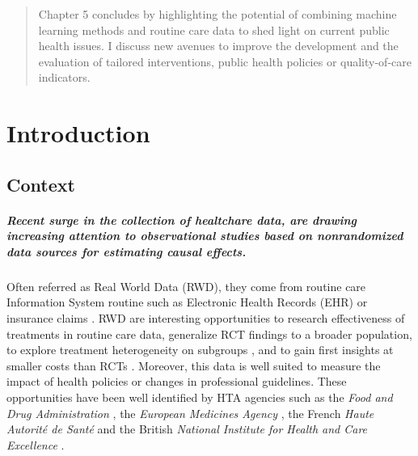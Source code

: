 \documentclass{report}
\begin{document}
\begin{abstract}
  Chapter 5 concludes by highlighting the potential of combining machine
  learning methods and routine care data to shed light on current public health
  issues. I discuss new avenues to improve the development and the evaluation of
  tailored interventions, public health policies or quality-of-care indicators.

\end{abstract}




\chapter{Introduction}

\section{Context}

\paragraph{Recent surge in the collection of healtchare data, are drawing
  increasing attention to observational studies based on nonrandomized data
  sources for estimating causal effects.} Often referred as Real World Data
(RWD), they come from routine care Information System routine such as
Electronic Health Records (EHR) or insurance claims \citep{wang2023emulation}.
RWD are interesting opportunities to research effectiveness of treatments in
routine care data, generalize RCT findings to a broader population, to explore
treatment heterogeneity on subgroups \citep{mant1999can, desai2021broadening},
and to gain first insights at smaller costs than RCTs
\citep{black1996we,bosdriesz2020evidence}. Moreover, this data is well suited
to measure the impact of health policies or changes in professional
guidelines. These opportunities have been well identified by HTA agencies such
as the \textit{Food and Drug Administration}
\citep{desai2021broadening,fda_real-world_2021}, the \textit{European
  Medicines Agency} \citep{flynn_marketing_2022}, the French \textit{Haute
  Autorité de Santé} \citep{vanier2023rapid} and the British \textit{National
  Institute for
  Health and Care Excellence} \citep{kent_nice_2022}.
\end{document}
